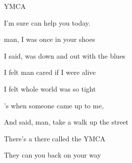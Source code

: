 \begin{SBSong}{YMCA}
\begin{SBVerse}
    I'm sure  can help you today.
  \end{SBVerse}
  \CBPageBrk
  \begin{SBVerse}
     man, I was once in your shoes

    I said,  was down and out with the blues

    I felt  man cared if I were alive

    I felt  whole world was so tight

    's when someone came up to me,

    And said,  man, take a walk up the street

    There's a  there called the YMCA

    They can  you back on your way
  \end{SBVerse}
\end{SBSong}
